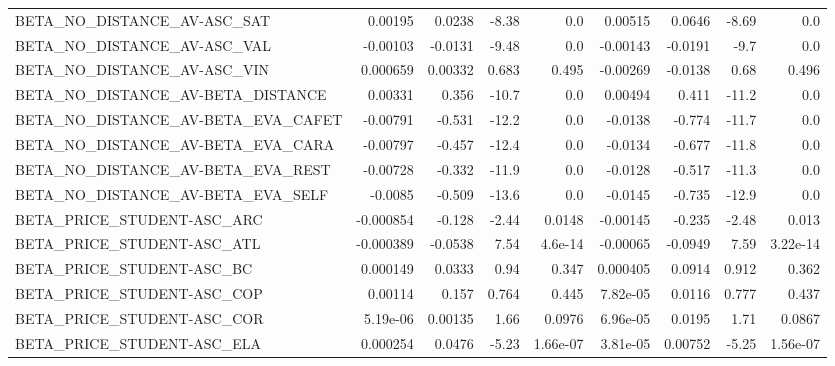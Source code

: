 \begin{tabular}{lrrrrrrrr}
BETA\_NO\_DISTANCE\_AV-ASC\_SAT            &     0.00195 &       0.0238 &   -8.38 &      0.0 &    0.00515 &      0.0646 &        -8.69 &           0.0 \\
BETA\_NO\_DISTANCE\_AV-ASC\_VAL            &    -0.00103 &      -0.0131 &   -9.48 &      0.0 &   -0.00143 &     -0.0191 &         -9.7 &           0.0 \\
BETA\_NO\_DISTANCE\_AV-ASC\_VIN            &    0.000659 &      0.00332 &   0.683 &    0.495 &   -0.00269 &     -0.0138 &         0.68 &         0.496 \\
BETA\_NO\_DISTANCE\_AV-BETA\_DISTANCE      &     0.00331 &        0.356 &   -10.7 &      0.0 &    0.00494 &       0.411 &        -11.2 &           0.0 \\
BETA\_NO\_DISTANCE\_AV-BETA\_EVA\_CAFET     &    -0.00791 &       -0.531 &   -12.2 &      0.0 &    -0.0138 &      -0.774 &        -11.7 &           0.0 \\
BETA\_NO\_DISTANCE\_AV-BETA\_EVA\_CARA      &    -0.00797 &       -0.457 &   -12.4 &      0.0 &    -0.0134 &      -0.677 &        -11.8 &           0.0 \\
BETA\_NO\_DISTANCE\_AV-BETA\_EVA\_REST      &    -0.00728 &       -0.332 &   -11.9 &      0.0 &    -0.0128 &      -0.517 &        -11.3 &           0.0 \\
BETA\_NO\_DISTANCE\_AV-BETA\_EVA\_SELF      &     -0.0085 &       -0.509 &   -13.6 &      0.0 &    -0.0145 &      -0.735 &        -12.9 &           0.0 \\
BETA\_PRICE\_STUDENT-ASC\_ARC             &   -0.000854 &       -0.128 &   -2.44 &   0.0148 &   -0.00145 &      -0.235 &        -2.48 &         0.013 \\
BETA\_PRICE\_STUDENT-ASC\_ATL             &   -0.000389 &      -0.0538 &    7.54 &  4.6e-14 &   -0.00065 &     -0.0949 &         7.59 &      3.22e-14 \\
BETA\_PRICE\_STUDENT-ASC\_BC              &    0.000149 &       0.0333 &    0.94 &    0.347 &   0.000405 &      0.0914 &        0.912 &         0.362 \\
BETA\_PRICE\_STUDENT-ASC\_COP             &     0.00114 &        0.157 &   0.764 &    0.445 &   7.82e-05 &      0.0116 &        0.777 &         0.437 \\
BETA\_PRICE\_STUDENT-ASC\_COR             &    5.19e-06 &      0.00135 &    1.66 &   0.0976 &   6.96e-05 &      0.0195 &         1.71 &        0.0867 \\
BETA\_PRICE\_STUDENT-ASC\_ELA             &    0.000254 &       0.0476 &   -5.23 & 1.66e-07 &   3.81e-05 &     0.00752 &        -5.25 &      1.56e-07 \\

\end{tabular}
